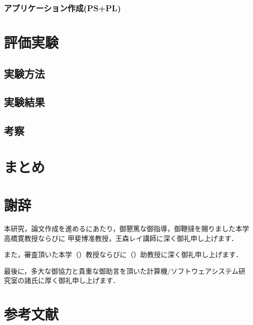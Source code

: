 \documentclass[11pt,a4j]{jreport}
\begin{document}
 \subsection{アプリケーション作成(PS+PL)}
%
\chapter{評価実験}
\section{実験方法}
\section{実験結果}
\section{考察}

\chapter{まとめ}

\chapter*{謝辞} %
本研究，論文作成を進めるにあたり，御懇篤な御指導，御鞭撻を賜りました本学高橋寛教授ならびに
甲斐博准教授，王森レイ講師に深く御礼申し上げます．

また，審査頂いた本学（）教授ならびに（）助教授に深く御礼申し上げます．

最後に，多大な御協力と貴重な御助言を頂いた計算機/ソフトウェアシステム研究室の諸氏に厚く御礼申し上げます．
\chapter*{参考文献}
\renewcommand{\bibname}{参考文献} %
\end{document}
